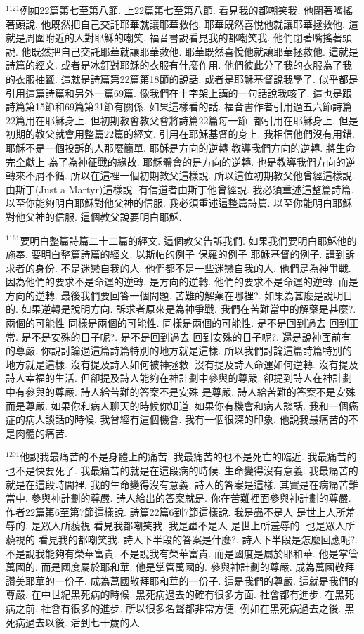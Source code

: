 \documentclass{book}
\begin{document}
$^{1121}$例如22篇第七至第八節.
上22篇第七至第八節.
看見我的都嘲笑我.
他閉著嘴搖著頭說.
他既然把自己交託耶華就讓耶華救他.
耶華既然喜悅他就讓耶華拯救他.
這就是周圍附近的人對耶穌的嘲笑.
福音書說看見我的都嘲笑我.
他們閉著嘴搖著頭說.
他既然把自己交託耶華就讓耶華救他.
耶華既然喜悅他就讓耶華拯救他.
這就是詩篇的經文.
或者是冰釘對耶穌的衣服有什麼作用.
他們彼此分了我的衣服為了我的衣服抽籤.
這就是詩篇第22篇第18節的說話.
或者是耶穌基督說我學了.
似乎都是引用這篇詩篇和另外一篇69篇.
像我們在十字架上講的一句話說我咳了.
這也是跟詩篇第15節和69篇第21節有關係.
如果這樣看的話.
福音書作者引用過五六節詩篇22篇用在耶穌身上.
但初期教會教父會將詩篇22篇每一節.
都引用在耶穌身上.
但是初期的教父就會用整篇22篇的經文.
引用在耶穌基督的身上.
我相信他們沒有用錯.
耶穌不是一個投訴的人那麼簡單.
耶穌是方向的逆轉 教導我們方向的逆轉.
將生命完全獻上 為了為神征戰的緣故.
耶穌體會的是方向的逆轉.
也是教導我們方向的逆轉來不屑不循.
所以在這裡一個初期教父這樣說.
所以這位初期教父他曾經這樣說.
由斯丁(Just a Martyr)這樣說.
有信道者由斯丁他曾經說.
我必須重述這整篇詩篇.
以至你能夠明白耶穌對他父神的信服.
我必須重述這整篇詩篇.
以至你能明白耶穌對他父神的信服.
這個教父說要明白耶穌.

$^{1161}$要明白整篇詩篇二十二篇的經文.
這個教父告訴我們.
如果我們要明白耶穌他的施奉.
要明白整篇詩篇的經文.
以斯帖的例子 保羅的例子 耶穌基督的例子.
講到訴求者的身份.
不是迷戀自我的人.
他們都不是一些迷戀自我的人.
他們是為神爭戰.
因為他們的要求不是命運的逆轉.
是方向的逆轉.
他們的要求不是命運的逆轉.
而是方向的逆轉.
最後我們要回答一個問題.
苦難的解藥在哪裡?.
如果為甚麼是說明目的.
如果逆轉是說明方向.
訴求者原來是為神爭戰.
我們在苦難當中的解藥是甚麼?.
兩個的可能性 同樣是兩個的可能性.
同樣是兩個的可能性.
是不是回到過去 回到正常.
是不是安殊的日子呢?.
是不是回到過去 回到安殊的日子呢?.
還是說神面前有的尊嚴.
你說討論過這篇詩篇特別的地方就是這樣.
所以我們討論這篇詩篇特別的地方就是這樣.
沒有提及詩人如何被神拯救.
沒有提及詩人命運如何逆轉.
沒有提及詩人幸福的生活.
但卻提及詩人能夠在神計劃中參與的尊嚴.
卻提到詩人在神計劃中有參與的尊嚴.
詩人給苦難的答案不是安殊 是尊嚴.
詩人給苦難的答案不是安殊 而是尊嚴.
如果你和病人聊天的時候你知道.
如果你有機會和病人談話.
我和一個癌症的病人談話的時候.
我曾經有這個機會.
我有一個很深的印象.
他說我最痛苦的不是肉體的痛苦.

$^{1201}$他說我最痛苦的不是身體上的痛苦.
我最痛苦的也不是死亡的臨近.
我最痛苦的也不是快要死了.
我最痛苦的就是在這段病的時候.
生命變得沒有意義.
我最痛苦的就是在這段時間裡.
我的生命變得沒有意義.
詩人的答案是這樣.
其實是在病痛苦難當中.
參與神計劃的尊嚴.
詩人給出的答案就是.
你在苦難裡面參與神計劃的尊嚴.
作者22篇第6至第7節這樣說.
詩篇22篇6到7節這樣說.
我是蟲不是人 是世上人所羞辱的.
是眾人所藐視 看見我都嘲笑我.
我是蟲不是人 是世上所羞辱的.
也是眾人所藐視的 看見我的都嘲笑我.
詩人下半段的答案是什麼?.
詩人下半段是怎麼回應呢?.
不是說我能夠有榮華富貴.
不是說我有榮華富貴.
而是國度是屬於耶和華.
他是掌管萬國的.
而是國度屬於耶和華.
他是掌管萬國的.
參與神計劃的尊嚴.
成為萬國敬拜讚美耶華的一份子.
成為萬國敬拜耶和華的一份子.
這是我們的尊嚴.
這就是我們的尊嚴.
在中世紀黑死病的時候.
黑死病過去的確有很多方面.
社會都有進步.
在黑死病之前.
社會有很多的進步.
所以很多名聲都非常方便.
例如在黑死病過去之後.
黑死病過去以後.
活到七十歲的人.
\end{document}
